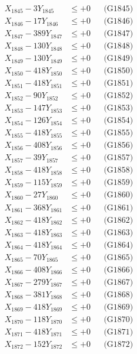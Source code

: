 \documentclass[a4paper,10pt]{article}
\begin{document}
{\begin{align}
X_{1845} - 3Y_{1845} &\leq +0 && \text{(G1845)} \\
X_{1846} - 17Y_{1846} &\leq +0 && \text{(G1846)} \\
X_{1847} - 389Y_{1847} &\leq +0 && \text{(G1847)} \\
X_{1848} - 130Y_{1848} &\leq +0 && \text{(G1848)} \\
X_{1849} - 130Y_{1849} &\leq +0 && \text{(G1849)} \\
X_{1850} - 418Y_{1850} &\leq +0 && \text{(G1850)} \\
\allowbreak
X_{1851} - 418Y_{1851} &\leq +0 && \text{(G1851)} \\
X_{1852} - 90Y_{1852} &\leq +0 && \text{(G1852)} \\
X_{1853} - 147Y_{1853} &\leq +0 && \text{(G1853)} \\
X_{1854} - 126Y_{1854} &\leq +0 && \text{(G1854)} \\
X_{1855} - 418Y_{1855} &\leq +0 && \text{(G1855)} \\
X_{1856} - 408Y_{1856} &\leq +0 && \text{(G1856)} \\
X_{1857} - 39Y_{1857} &\leq +0 && \text{(G1857)} \\
X_{1858} - 418Y_{1858} &\leq +0 && \text{(G1858)} \\
X_{1859} - 115Y_{1859} &\leq +0 && \text{(G1859)} \\
X_{1860} - 27Y_{1860} &\leq +0 && \text{(G1860)} \\
\allowbreak
X_{1861} - 368Y_{1861} &\leq +0 && \text{(G1861)} \\
X_{1862} - 418Y_{1862} &\leq +0 && \text{(G1862)} \\
X_{1863} - 418Y_{1863} &\leq +0 && \text{(G1863)} \\
X_{1864} - 418Y_{1864} &\leq +0 && \text{(G1864)} \\
X_{1865} - 70Y_{1865} &\leq +0 && \text{(G1865)} \\
X_{1866} - 408Y_{1866} &\leq +0 && \text{(G1866)} \\
X_{1867} - 279Y_{1867} &\leq +0 && \text{(G1867)} \\
X_{1868} - 381Y_{1868} &\leq +0 && \text{(G1868)} \\
X_{1869} - 418Y_{1869} &\leq +0 && \text{(G1869)} \\
X_{1870} - 118Y_{1870} &\leq +0 && \text{(G1870)} \\
\allowbreak
X_{1871} - 418Y_{1871} &\leq +0 && \text{(G1871)} \\
X_{1872} - 152Y_{1872} &\leq +0 && \text{(G1872)} \\

\end{align}}
\end{document}
